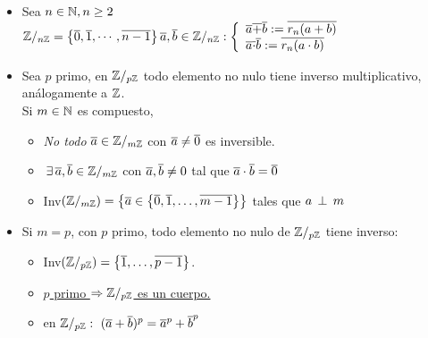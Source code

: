 \begin{itemize}
	\item Sea $n \en \naturales, n\geq2$\\
	      $
		      \moduloN{n} = \set{\clase{0},\clase{1},\cdots, \clase{n-1} }\\
		      \clase{a},\clase{b} \en \moduloN n:
		      \llave{l}{
			      \clase{a} \clase{+} \clase{b} := \overline{r_n(a+b)} \\
			      \clase{a} \clase{\cdot} \clase{b} := \overline{r_n(a\cdot b)}
		      }
	      $
	\item Sea $p$ primo, en $\moduloN{p}$ todo elemento no nulo tiene inverso multiplicativo,
	      análogamente a $\enteros$.\\
	      Si $m \en \naturales$ es compuesto,

	      \begin{itemize}
		      \item \textit{No todo} $\clase{a} \en \moduloN{m}$ con $\clase{a} \distinto \clase{0}$ es inversible.

		      \item $\existe \clase{a}, \clase{b} \en \moduloN{m}$ con $\clase{a}, \clase{b} \distinto 0$ tal que
		            $\clase{a}\cdot \clase{b} = \clase{0}$

		      \item Inv$(\moduloN m) = \set{\clase{a} \en \set{\clase{0},\clase{1},\dots, \clase{m-1}}}$ tales que
		            $a \cop m$
	      \end{itemize}
	\item Si $m = p$, con $p$ primo, todo elemento no nulo de $\moduloN p$ tiene inverso:
	      \begin{itemize}
		      \item Inv$(\moduloN p) = \set{\clase{1},\dots, \clase{p-1}}$.
		      \item  \underline{$p$ primo $\entonces \moduloN p$ es un cuerpo.}
              \item en $\moduloN{p}:\ (\clase{a} + \clase{b})^p = \clase{a}^p + \clase{b}^p $
	      \end{itemize}

\end{itemize}

